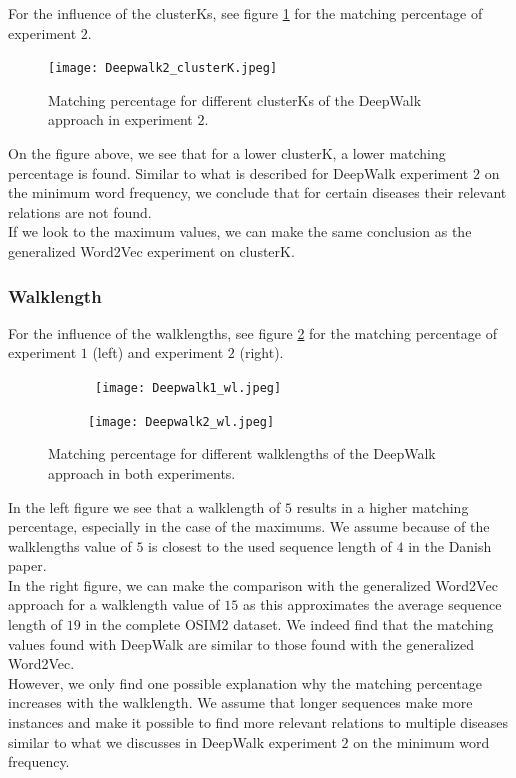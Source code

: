 \noindent For the influence of the clusterKs, see figure \ref{fig:dw_clusterK_2} for the matching percentage of experiment $2$.\\

\begin{figure}[!htb]
	\centering
	\texttt{[image: Deepwalk2\_clusterK.jpeg]}
	\caption{Matching percentage for different clusterKs of the DeepWalk approach in experiment $2$.}
	\label{fig:dw_clusterK_2}
\end{figure}

\noindent On the figure above, we see that for a lower clusterK, a lower matching percentage is found. Similar to what is described for DeepWalk experiment $2$ on the minimum word frequency, we conclude that for certain diseases their relevant relations are not found. \\
If we look to the maximum values, we can make the same conclusion as the generalized Word2Vec experiment on clusterK.

\subsubsection{Walklength}

For the influence of the walklengths, see figure \ref{fig:dw_wl} for the matching percentage of experiment $1$ (left) and experiment $2$ (right). \\

\begin{figure}[!htb]
	\centering
	\begin{subfigure}[b]{.49\textwidth}\
		\texttt{[image: Deepwalk1\_wl.jpeg]}
	\end{subfigure}
	\begin{subfigure}[b]{.49\textwidth}
		\texttt{[image: Deepwalk2\_wl.jpeg]}
	\end{subfigure}
	\caption{Matching percentage for different walklengths of the DeepWalk approach in both experiments.}
	\label{fig:dw_wl}
\end{figure}

In the left figure we see that a walklength of $5$ results in a higher matching percentage, especially in the case of the maximums. We assume because of the walklengths value of $5$ is closest to the used sequence length of $4$ in the Danish paper. \\

In the right figure, we can make the comparison with the generalized Word2Vec approach for a walklength value of $15$ as this approximates the average sequence length of $19$ in the complete OSIM2 dataset. We indeed find that the matching values found with DeepWalk are similar to those found with the generalized Word2Vec. \\
However, we only find one possible explanation why the matching percentage increases with the walklength. We assume that longer sequences make more instances and make it possible to find more relevant relations to multiple diseases similar to what we discusses in DeepWalk experiment $2$ on the minimum word frequency. \\

